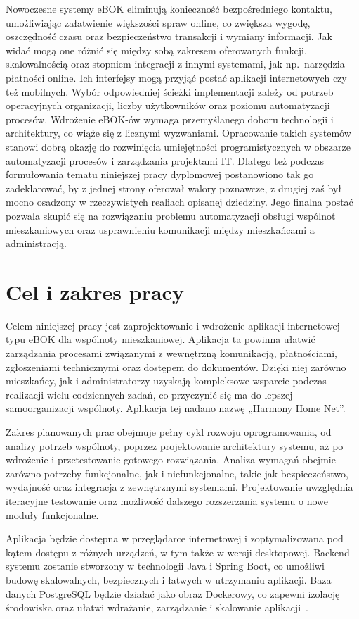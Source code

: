 Nowoczesne systemy eBOK eliminują konieczność bezpośredniego kontaktu, umożliwiając załatwienie większości spraw online, co zwiększa wygodę, oszczędność czasu oraz bezpieczeństwo transakcji i wymiany informacji. Jak widać mogą one różnić się między sobą zakresem oferowanych funkcji, skalowalnością oraz stopniem integracji z innymi systemami, jak np.\ narzędzia płatności online. Ich interfejsy mogą przyjąć postać aplikacji internetowych czy też mobilnych. Wybór odpowiedniej ścieżki implementacji zależy od potrzeb operacyjnych organizacji, liczby użytkowników oraz poziomu automatyzacji procesów. Wdrożenie eBOK-ów wymaga przemyślanego doboru technologii i architektury, co wiąże się z licznymi wyzwaniami. Opracowanie takich systemów stanowi dobrą okazję do rozwinięcia umiejętności programistycznych w obszarze automatyzacji procesów i zarządzania projektami IT. Dlatego też podczas formułowania tematu niniejszej pracy dyplomowej postanowiono tak go zadeklarować, by z jednej strony oferował walory poznawcze, z drugiej zaś był mocno osadzony w rzeczywistych realiach opisanej dziedziny. Jego finalna postać pozwala skupić się na rozwiązaniu problemu automatyzacji obsługi wspólnot mieszkaniowych oraz usprawnieniu komunikacji między mieszkańcami a administracją.

\section{Cel i zakres pracy}
Celem niniejszej pracy jest zaprojektowanie i wdrożenie aplikacji internetowej typu eBOK dla wspólnoty mieszkaniowej. Aplikacja ta powinna ułatwić zarządzania procesami związanymi z wewnętrzną komunikacją, płatnościami, zgłoszeniami technicznymi oraz dostępem do dokumentów. Dzięki niej zarówno mieszkańcy, jak i administratorzy uzyskają kompleksowe wsparcie podczas realizacji wielu codziennych zadań, co przyczynić się ma do lepszej samoorganizacji wspólnoty. Aplikacja tej nadano nazwę „Harmony Home Net”.

Zakres planowanych prac obejmuje pełny cykl rozwoju oprogramowania, od analizy potrzeb wspólnoty, poprzez projektowanie architektury systemu, aż po wdrożenie i przetestowanie gotowego rozwiązania. Analiza wymagań obejmie zarówno potrzeby funkcjonalne, jak i niefunkcjonalne, takie jak bezpieczeństwo, wydajność oraz integracja z zewnętrznymi systemami. Projektowanie uwzględnia iteracyjne testowanie oraz możliwość dalszego rozszerzania systemu o nowe moduły funkcjonalne.

Aplikacja będzie dostępna w przeglądarce internetowej i zoptymalizowana pod kątem dostępu z różnych urządzeń, w tym także w wersji desktopowej. Backend systemu zostanie stworzony w technologii Java i Spring Boot, co umożliwi budowę skalowalnych, bezpiecznych i łatwych w utrzymaniu aplikacji. Baza danych PostgreSQL będzie działać jako obraz Dockerowy, co zapewni izolację środowiska oraz ułatwi wdrażanie, zarządzanie i skalowanie aplikacji~\cite{EARTHLY}.

